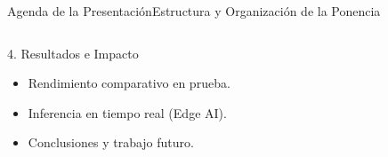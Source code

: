\documentclass[aspectratio=169, 10pt]{beamer}
\begin{document}
\begin{frame}{Agenda de la Presentación}{Estructura y Organización de la Ponencia}
\begin{columns}[T]
        \vspace{0.15cm}
        \begin{successblock}{4. Resultados e Impacto}
            \begin{itemize}
                \item Rendimiento comparativo en prueba.
                \item Inferencia en tiempo real (Edge AI).
                \item Conclusiones y trabajo futuro.
            \end{itemize}
        \end{successblock}
    \end{columns}
\end{frame}

\end{document}
